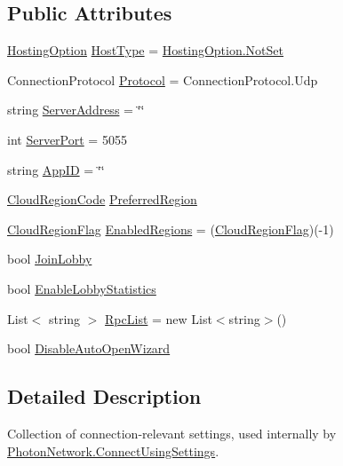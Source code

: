 \subsection*{Public Attributes}
\begin{DoxyCompactItemize}
\item 
\hyperlink{class_server_settings_ac70398ae8a3414ab1429069965cfcd32}{Hosting\+Option} \hyperlink{class_server_settings_ae09a675e680b68d1ed6117ae990e0140}{Host\+Type} = \hyperlink{class_server_settings_ac70398ae8a3414ab1429069965cfcd32afaf396cbd83927b72a84d2616fac76ff}{Hosting\+Option.\+Not\+Set}
\item 
Connection\+Protocol \hyperlink{class_server_settings_a2fafc5c45a737f8090fef92f080bfd50}{Protocol} = Connection\+Protocol.\+Udp
\item 
string \hyperlink{class_server_settings_ac93d5ddacf54f0efb974bb3c57537275}{Server\+Address} = \char`\"{}\char`\"{}
\item 
int \hyperlink{class_server_settings_a61d571180623076b8a12b9d2ca550411}{Server\+Port} = 5055
\item 
string \hyperlink{class_server_settings_a683ee8add05e046c395ecbcd2c077052}{App\+ID} = \char`\"{}\char`\"{}
\item 
\hyperlink{_enums_8cs_af823e3be9567fa753720895120c9819b}{Cloud\+Region\+Code} \hyperlink{class_server_settings_a3b8285422f8ec14b98457c0935304b6d}{Preferred\+Region}
\item 
\hyperlink{_enums_8cs_aff1692196dd6f4a13b64044f3b1456d1}{Cloud\+Region\+Flag} \hyperlink{class_server_settings_a16c0927185e85b1c45492481b49e1721}{Enabled\+Regions} = (\hyperlink{_enums_8cs_aff1692196dd6f4a13b64044f3b1456d1}{Cloud\+Region\+Flag})(-\/1)
\item 
bool \hyperlink{class_server_settings_ab20cfb9bd2fd6526bb96d76c5ef5fcdc}{Join\+Lobby}
\item 
bool \hyperlink{class_server_settings_a604fa40c04419dd5972f6d6c0710ac44}{Enable\+Lobby\+Statistics}
\item 
List$<$ string $>$ \hyperlink{class_server_settings_abe34064564018fc67afae2142c244cba}{Rpc\+List} = new List$<$string$>$()
\item 
bool \hyperlink{class_server_settings_a0bc41aab7289ce45195f260077b91e48}{Disable\+Auto\+Open\+Wizard}
\end{DoxyCompactItemize}


\subsection{Detailed Description}
Collection of connection-\/relevant settings, used internally by \hyperlink{class_photon_network_a0fdb79bcce45801ec81fbe56ffb939ec}{Photon\+Network.\+Connect\+Using\+Settings}. 



